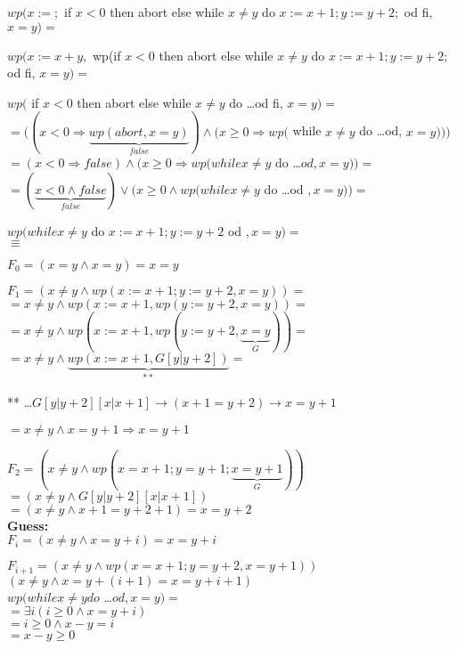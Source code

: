 $wp(x:=;$ if $x < 0$ then abort else while $x \neq y$ do $x:= x+1; y:=y+2;$
  od fi, $x=y) =$

$wp(x:=x+y,$ wp(if $x<0$ then abort else while $x \neq y$ do 
  $x:=x+1; y:=y+2;$ od fi, $x=y) =$

$wp($ if $x<0$ then abort else while $x \neq y$ do \dots od fi, $x=y) =$ \\
$=(( x<0 \Rightarrow \underbrace{wp(abort, x = y)}_{false} ) \land (x \geq 0 \Rightarrow wp($
  while $x \neq y$ do \dots od, $x=y)))$\\
$=(x<0 \Rightarrow false) \land (x \geq0 \Rightarrow wp(while  x\neq y$ 
  do \dots $od, x=y)) = $\\
$=(\underbrace{x<0 \land false}_{false}) \lor (x\geq 0 \land 
  wp(while x \neq y$ do \dots od $, x=y)) =$

$wp(while x\neq y$ do $x:=x+1; y:=y+2$ od $, x=y) =$\\


$\equiv $

$F_0 = (x=y \land x=y) = x=y$

$F_1 = (x\neq y \land wp(x:=x+1; y:=y+2, x=y)) = $
$ = x\neq y \land wp(x:=x+1, wp(y:=y+2, x=y)) = $\\
$ = x\neq y \land wp(x:=x+1, wp(y:=y+2, \underbrace{x=y}_{G})) = $\\
$ = x\neq y \land \underbrace{wp(x:=x+1, G[y|y+2])}_{**} = $
\begin{flushright} %
    ** \dots $G[y|y+2][x|x+1] \rightarrow (x+1 = y+2) \rightarrow x = y+1$
\end{flushright}
\noindent $ = x\neq y \land x=y+1 \Rightarrow x=y+1$

$F_2 = (x\neq y \land wp(x=x+1; y=y+1; \underbrace{x=y+1}_{G}))$\\
$ = (x\neq y \land G[y|y+2][x|x+1])$\\
$ = (x\neq y \land x+1 = y+2+1) = x=y+2$\\

\textbf{Guess:}\\

$F_i = (x\neq y \land x=y+i) = x=y+i$

$F_{i+1} = (x\neq y \land wp(x=x+1; y=y+2, x=y+1))$\\
$(x\neq y \land x=y+(i+1) = x=y+i+1)$\\


$wp(while x\neq y do$ \dots $od, x=y) =$\\
$= \exists i(i\geq 0\land x=y+i)$\\
$= i\geq 0 \land x-y=i$\\
$= x-y\geq 0$\\

